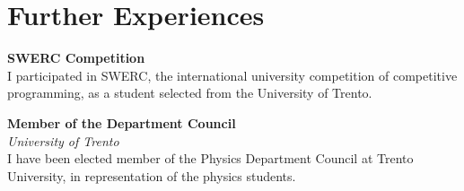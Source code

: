 \documentclass[a4paper,10pt]{article}
\begin{document}
\begin{adjustbox}{valign=t}
\begin{minipage}{0.6\textwidth}
\section*{Further Experiences}
\begin{description}
\raggedright
\item[\normalfont \textcolor{ColorTwo}{March 2021}] 
	\textbf{SWERC Competition}\\
	\small
	I participated in SWERC, the international university competition of competitive programming, as a student selected from the University of Trento.
	\normalsize
\item[\normalfont \textcolor{ColorTwo}{Nov 2020 - Jul 2021}] 
	\textbf{Member of the Department Council}\\
	
	\emph{University of Trento}\\
	\small 
	I have been elected member of the Physics Department Council at Trento University, in representation of the physics students.
    \normalsize
\end{description}

\MySkip
\LastUpdate
\end{minipage}
\end{adjustbox}
\end{document}
